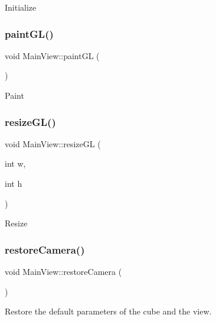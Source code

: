 Initialize \hypertarget{class_main_view_a9b9be05c20817f6eb853bd58c406f0e0}{}\label{class_main_view_a9b9be05c20817f6eb853bd58c406f0e0} 
\subsubsection{\texorpdfstring{paint\+G\+L()}{paintGL()}}
{\footnotesize\ttfamily void Main\+View\+::paint\+GL (\begin{DoxyParamCaption}{ }\end{DoxyParamCaption})\hspace{0.3cm}{\ttfamily [protected]}}

Paint \hypertarget{class_main_view_a8d8c7515e0a637a0db30608ebf489f1d}{}\label{class_main_view_a8d8c7515e0a637a0db30608ebf489f1d} 
\subsubsection{\texorpdfstring{resize\+G\+L()}{resizeGL()}}
{\footnotesize\ttfamily void Main\+View\+::resize\+GL (\begin{DoxyParamCaption}\item[{int}]{w,  }\item[{int}]{h }\end{DoxyParamCaption})\hspace{0.3cm}{\ttfamily [protected]}}

Resize \hypertarget{class_main_view_ad30cbdd44fc8711ec461bd268fe9d66a}{}\label{class_main_view_ad30cbdd44fc8711ec461bd268fe9d66a} 
\subsubsection{\texorpdfstring{restore\+Camera()}{restoreCamera()}}
{\footnotesize\ttfamily void Main\+View\+::restore\+Camera (\begin{DoxyParamCaption}{ }\end{DoxyParamCaption})}



Restore the default parameters of the cube and the view. 

\hypertarget{class_main_view_a4534f6ae9efa1c02922692dc06cc335a}{}\label{class_main_view_a4534f6ae9efa1c02922692dc06cc335a} 

